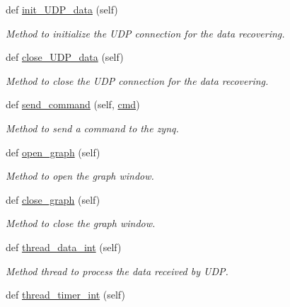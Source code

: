 \begin{DoxyCompactItemize}
def \mbox{\hyperlink{classwatchman_1_1_watchman__main__window_a116e7145b9e06726e1c5318fd8719697}{init\+\_\+\+U\+D\+P\+\_\+data}} (self)
\begin{DoxyCompactList}\small\item\em Method to initialize the U\+DP connection for the data recovering. \end{DoxyCompactList}\item 
def \mbox{\hyperlink{classwatchman_1_1_watchman__main__window_a82bd875a2c1e218633bb245011730233}{close\+\_\+\+U\+D\+P\+\_\+data}} (self)
\begin{DoxyCompactList}\small\item\em Method to close the U\+DP connection for the data recovering. \end{DoxyCompactList}\item 
def \mbox{\hyperlink{classwatchman_1_1_watchman__main__window_a90ee7e25dde8f15c709b9a9c8fd4dbde}{send\+\_\+command}} (self, \mbox{\hyperlink{classwatchman_1_1_watchman__main__window_a310b7c8167f86e485d54689b8aa1ed12}{cmd}})
\begin{DoxyCompactList}\small\item\em Method to send a command to the zynq. \end{DoxyCompactList}\item 
def \mbox{\hyperlink{classwatchman_1_1_watchman__main__window_a99d6e254c6da829ebe7b2798806af3bf}{open\+\_\+graph}} (self)
\begin{DoxyCompactList}\small\item\em Method to open the graph window. \end{DoxyCompactList}\item 
def \mbox{\hyperlink{classwatchman_1_1_watchman__main__window_a7e01631a60bb1132b837329deb96ca73}{close\+\_\+graph}} (self)
\begin{DoxyCompactList}\small\item\em Method to close the graph window. \end{DoxyCompactList}\item 
def \mbox{\hyperlink{classwatchman_1_1_watchman__main__window_a59982ccfdd3e2145e28e9b6200ccf5ce}{thread\+\_\+data\+\_\+int}} (self)
\begin{DoxyCompactList}\small\item\em Method thread to process the data received by U\+DP. \end{DoxyCompactList}\item 
def \mbox{\hyperlink{classwatchman_1_1_watchman__main__window_a084e9e77a70c9f8e6e36fec24a8f590d}{thread\+\_\+timer\+\_\+int}} (self)

\end{DoxyCompactItemize}
